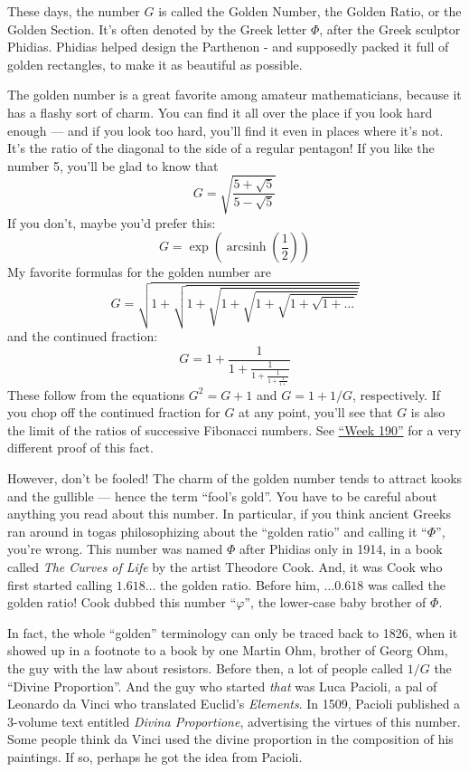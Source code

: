 \documentclass{article}
\begin{document}
These days, the number \(G\) is called the Golden Number, the Golden
Ratio, or the Golden Section. It's often denoted by the Greek letter
\(\Phi\), after the Greek sculptor Phidias. Phidias helped design the
Parthenon - and supposedly packed it full of golden rectangles, to make
it as beautiful as possible.

The golden number is a great favorite among amateur mathematicians,
because it has a flashy sort of charm. You can find it all over the
place if you look hard enough --- and if you look too hard, you'll find
it even in places where it's not. It's the ratio of the diagonal to the
side of a regular pentagon! If you like the number 5, you'll be glad to
know that \[G = \sqrt{\frac{5+\sqrt{5}}{5-\sqrt{5}}}\] If you don't,
maybe you'd prefer this:
\[G = \exp\left(\operatorname{arcsinh}\left(\frac12\right)\right)\] My favorite
formulas for the golden number are
\[G = \sqrt{1 + \sqrt{1 + \sqrt{1 + \sqrt{1 + \sqrt{1 + \sqrt{1 + \ldots}}}}}}\]
and the continued fraction:
\[G = 1 + \frac{1}{1 + \frac{1}{1 + \frac{1}{1 + \frac{1}{1 + }}}}\]
These follow from the equations \(G^2 = G + 1\) and \(G = 1 + 1/G\),
respectively. If you chop off the continued fraction for \(G\) at any
point, you'll see that \(G\) is also the limit of the ratios of
successive Fibonacci numbers. See \protect\hyperlink{week190}{``Week
190''} for a very different proof of this fact.

However, don't be fooled! The charm of the golden number tends to
attract kooks and the gullible --- hence the term ``fool's gold''. You
have to be careful about anything you read about this number. In
particular, if you think ancient Greeks ran around in togas
philosophizing about the ``golden ratio'' and calling it ``\(\Phi\)'',
you're wrong. This number was named \(\Phi\) after Phidias only in 1914,
in a book called \emph{The Curves of Life} by the artist Theodore Cook.
And, it was Cook who first started calling \(1.618\ldots\) the golden
ratio. Before him, \(\ldots0.618\) was called the golden ratio! Cook
dubbed this number ``\(\varphi\)'', the lower-case baby brother of
\(\Phi\).

In fact, the whole ``golden'' terminology can only be traced back to
1826, when it showed up in a footnote to a book by one Martin Ohm,
brother of Georg Ohm, the guy with the law about resistors. Before then,
a lot of people called \(1/G\) the ``Divine Proportion''. And the guy
who started \emph{that} was Luca Pacioli, a pal of Leonardo da Vinci who
translated Euclid's \emph{Elements}. In 1509, Pacioli published a
3-volume text entitled \emph{Divina Proportione}, advertising the
virtues of this number. Some people think da Vinci used the divine
proportion in the composition of his paintings. If so, perhaps he got
the idea from Pacioli.
\end{document}
